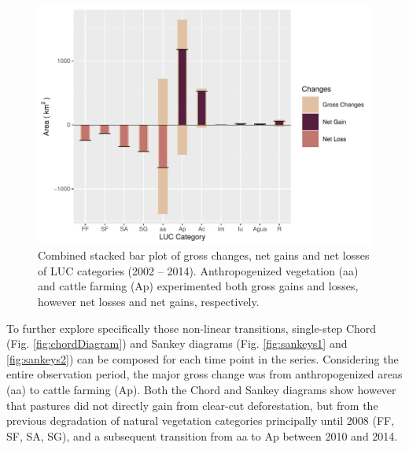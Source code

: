 \begin{Schunk}
\begin{figure}[h]

{\centering \includegraphics[width=1\linewidth]{figures/net_gross.pdf} 

}

\caption[Net Gross Changes 2002 - 2014]{Combined stacked bar plot of gross changes, net gains and net losses of LUC categories (2002 – 2014). Anthropogenized vegetation (aa) and cattle farming (Ap) experimented both gross gains and losses, however net losses and net gains, respectively.}\label{fig:ng_plot}
\end{figure}
\end{Schunk}

To further explore specifically those non-linear transitions,
single-step Chord (Fig. \ref{fig:chordDiagram}) and Sankey diagrams
(Fig. \ref{fig:sankeys1} and \ref{fig:sankeys2}) can be composed for
each time point in the series. Considering the entire observation
period, the major gross change was from anthropogenized areas (aa) to
cattle farming (Ap). Both the Chord and Sankey diagrams show however
that pastures did not directly gain from clear-cut deforestation, but
from the previous degradation of natural vegetation categories
principally until 2008 (FF, SF, SA, SG), and a subsequent transition
from aa to Ap between 2010 and 2014.

